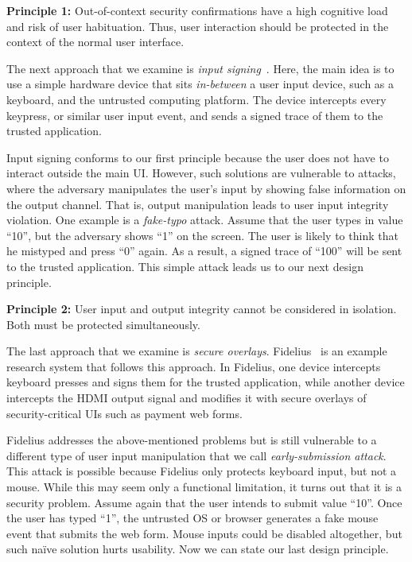\documentclass[letterpaper,twocolumn,10pt]{article}
\begin{document}
\begin{tcolorbox}
\textbf{Principle 1:} Out-of-context security confirmations have a high cognitive load and risk of user habituation. Thus, user interaction should be protected in the context of the normal user interface.
\end{tcolorbox}

The next approach that we examine is \emph{input signing}~\cite{IntegriKey}. Here, the main idea is to use a simple hardware device that sits \emph{in-between} a user input device, such as a keyboard, and the untrusted computing platform. The device intercepts every keypress, or similar user input event, and sends a signed trace of them to the trusted application. 

Input signing conforms to our first principle because the user does not have to interact outside the main UI. However, such solutions are vulnerable to attacks, where the adversary manipulates the user's input by showing false information on the output channel. That is, output manipulation leads to user input integrity violation. One example is a \emph{fake-typo} attack. Assume that the user types in value ``10'', but the adversary shows ``1'' on the screen. The user is likely to think that he mistyped and press ``0'' again. As a result, a signed trace of ``100'' will be sent to the trusted application. This simple attack leads us to our next design principle.

\begin{tcolorbox}
\textbf{Principle 2:} User input and output integrity cannot be considered in isolation. Both must be protected simultaneously.
\end{tcolorbox}

The last approach that we examine is \emph{secure overlays}. Fidelius~\cite{Fidelius} is an example research system that follows this approach. In Fidelius, one device intercepts keyboard presses and signs them for the trusted application, while another device intercepts the HDMI output signal and modifies it with secure overlays of security-critical UIs such as payment web forms. 

Fidelius addresses the above-mentioned problems but is still vulnerable to a different type of user input manipulation that we call \emph{early-submission attack}. This attack is possible because Fidelius only protects keyboard input, but not a mouse. While this may seem only a functional limitation, it turns out that it is a security problem. Assume again that the user intends to submit value ``10''. Once the user has typed ``1'', the untrusted OS or browser generates a fake mouse event that submits the web form. Mouse inputs could be disabled altogether, but such na\"ive solution hurts usability. Now we can state our last design principle.
\end{document}
